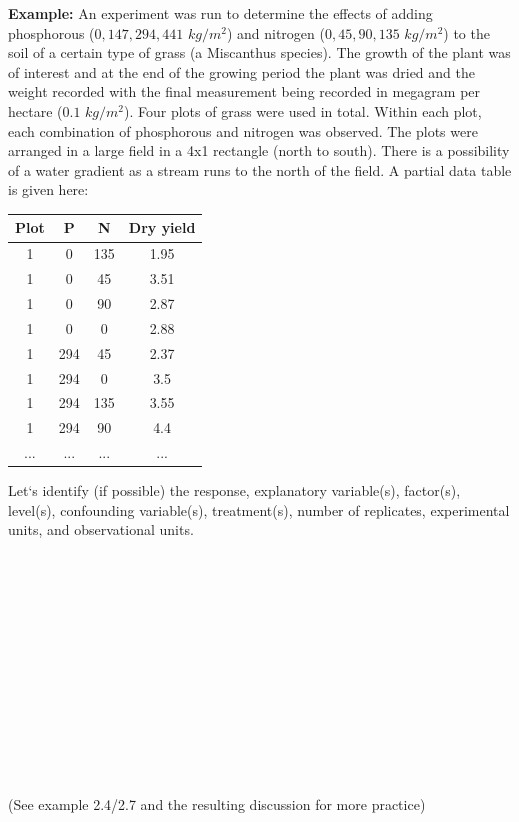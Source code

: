 \textbf{Example: } An experiment was run to determine the effects of adding phosphorous ($0, 147, 294, 441$ $kg/m^2$) and nitrogen ($0, 45, 90, 135$ $kg/m^2$) to the soil of a certain type of grass (a Miscanthus species).  The growth of the plant was of interest and at the end of the growing period the plant was dried and the weight recorded with the final measurement being recorded in megagram per hectare ($0.1$ $kg/m^2$).  Four plots of grass were used in total.  Within each plot, each combination of phosphorous and nitrogen was observed.  The plots were arranged in a large field in a 4x1 rectangle (north to south).  There is a possibility of a water gradient as a stream runs to the north of the field.   A partial data table is given here: 
\begin{center}
\begin{tabular}{c|c|c|c}
\hline
Plot	&P	&N&	Dry yield\\
\hline
1&	0&	135&	1.95\\
1&	0&	45&	3.51\\
1&	0&	90&	2.87\\
1&	0&	0&	2.88\\
1&	294	&45&	2.37\\
1&	294	&0&	3.5\\
1&	294	&135&	3.55\\
1&	294&	90&	4.4\\
...&...&...&...\\
\end{tabular}
\end{center}
Let`s identify (if possible) the response, explanatory variable(s), factor(s), level(s), confounding variable(s), treatment(s), number of replicates, experimental units, and observational units.  \\~\\~\\~\\~\\~\\~\\~\\~\\~\\~\\~\\~\\~\\
(See example 2.4/2.7 and the resulting discussion for more practice)

\newpage

